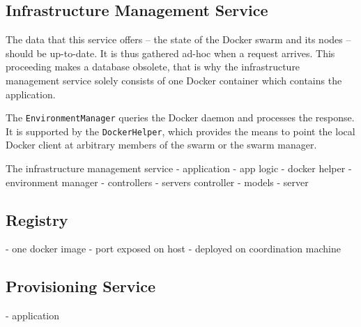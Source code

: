   \subsection{Infrastructure Management Service} %
    \label{sub:infrastructure_management_service}
      The data that this service offers -- the state of the Docker swarm and its nodes -- should be up-to-date. It is thus gathered ad-hoc when a request arrives. This proceeding makes a database obsolete, that is why the infrastructure management service solely consists of one Docker container which contains the application.

      The \texttt{EnvironmentManager} queries the Docker daemon and processes the response. It is supported by the \texttt{DockerHelper}, which provides the means to point the local Docker client at arbitrary members of the swarm or the swarm manager.



      The infrastructure management service
      - application
        - app logic
          - docker helper
          - environment manager
        - controllers
          - servers controller
        - models
          - server


  \subsection{Registry} %
    \label{sub:registry}
    - one docker image
    - port exposed on host
    - deployed on coordination machine

  \subsection{Provisioning Service} %
    \label{sub:provisioning_service}
      - application


